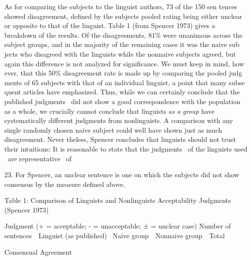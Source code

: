 \begin{styleStandard}
As for comparing the subjects to the linguist authors, 73 of the 150 sen\- tences showed disagreement, defined by the subjects{\textquotesingle} pooled rating being either unclear or opposite to that of the linguist. Table 1 (from Spencer 1973) gives a breakdown of the results. Of the disagreements, 81\% were unanimous across the subject groups, and in the majority of the remaining cases it was the naive sub\- jects who disagreed with the linguists while the nonnaive subjects agreed, but again this difference is not analyzed for significance. We must keep in mind, how\- ever, that this 50\% disagreement rate is made up by comparing the pooled judg\- ments of 65 subjects with that of an individual linguist, a point that many subse\- quent articles have emphasized. Thus, while we can certainly conclude that the published judgments \ did not show a good correspondence with the population as a whole, we crucially cannot conclude that linguists \textit{as}\textit{ }\textit{a}\textit{ }\textit{group}\textit{ }have systematically different judgments from nonlinguists. A comparison with any single randomly chosen naive subject could well have shown just as much disagreement. Never\- theless, Spencer concludes that linguists should not trust their intuitions: {\textquotedbl}It is reasonable to state that the judgments \ of the linguists used \ are representative \ of
\end{styleStandard}


\begin{styleStandard}
23. For Spencer, an unclear sentence is one on which the subjects did not show consensus by the measure defined above.
\end{styleStandard}


\clearpage\setcounter{page}{1}\begin{styleStandard}
Table 1: Comparison of Linguists{\textquotesingle} and Nonlinguists{\textquotesingle} Acceptability Judgments (Spencer 1973)
\end{styleStandard}


\begin{styleStandard}
Judgment (+ = acceptable; {}- = unacceptable; ± = unclear case) Number of sentences\ \ Linguist (as published) \ Naive group\ \ Nonnaive group\ \ Total
\end{styleStandard}


\begin{styleStandard}
Consensual Agreement
\end{styleStandard}


